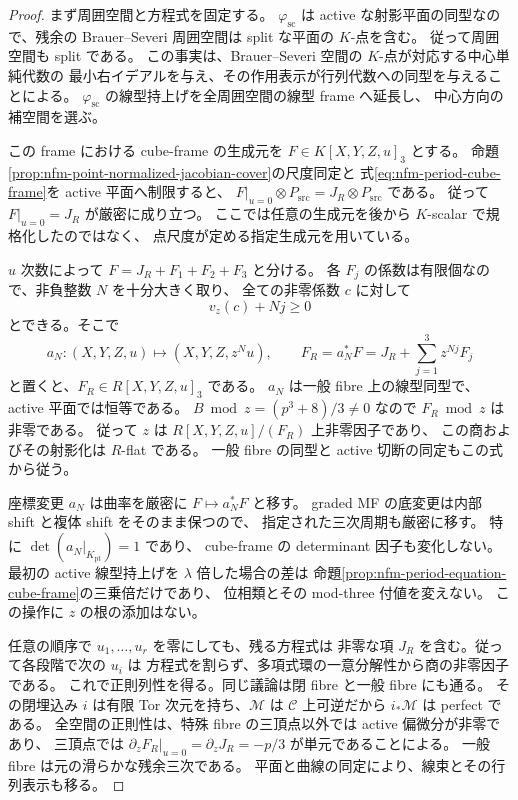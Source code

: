 \begin{proof}
まず周囲空間と方程式を固定する。
$\varphi_{\mathrm{sc}}$ は active な射影平面の同型なので、残余の
Brauer--Severi 周囲空間は split な平面の $K$-点を含む。
従って周囲空間も split である。
この事実は、Brauer--Severi 空間の $K$-点が対応する中心単純代数の
最小右イデアルを与え、その作用表示が行列代数への同型を与えることによる。
$\varphi_{\mathrm{sc}}$ の線型持上げを全周囲空間の線型 frame へ延長し、
中心方向の補空間を選ぶ。

この frame における cube-frame の生成元を $F\in K[X,Y,Z,u]_3$ とする。
命題\ref{prop:nfm-point-normalized-jacobian-cover}の尺度同定と
式\eqref{eq:nfm-period-cube-frame}を active 平面へ制限すると、
$F|_{u=0}\otimes P_{\mathrm{src}}=J_R\otimes P_{\mathrm{src}}$ である。
従って $F|_{u=0}=J_R$ が厳密に成り立つ。
ここでは任意の生成元を後から $K$-scalar で規格化したのではなく、
点尺度が定める指定生成元を用いている。

$u$ 次数によって $F=J_R+F_1+F_2+F_3$ と分ける。
各 $F_j$ の係数は有限個なので、非負整数 $N$ を十分大きく取り、
全ての非零係数 $c$ に対して
\[
 v_z(c)+Nj\ge0
\]
とできる。そこで
\[
 a_N:(X,Y,Z,u)\longmapsto(X,Y,Z,z^N u),\qquad
 F_R=a_N^*F=J_R+\sum_{j=1}^3z^{Nj}F_j
\]
と置くと、$F_R\in R[X,Y,Z,u]_3$ である。
$a_N$ は一般 fibre 上の線型同型で、active 平面では恒等である。
$B\bmod z=(p^3+8)/3\ne0$ なので $F_R\bmod z$ は非零である。
従って $z$ は $R[X,Y,Z,u]/(F_R)$ 上非零因子であり、
この商およびその射影化は $R$-flat である。
一般 fibre の同型と active 切断の同定もこの式から従う。

座標変更 $a_N$ は曲率を厳密に $F\mapsto a_N^*F$ と移す。
graded MF の底変更は内部 shift と複体 shift をそのまま保つので、
指定された三次周期も厳密に移す。
特に $\det(a_N|_{K_{\mathrm{pt}}})=1$ であり、
cube-frame の determinant 因子も変化しない。
最初の active 線型持上げを $\lambda$ 倍した場合の差は
命題\ref{prop:nfm-period-equation-cube-frame}の三乗倍だけであり、
位相類とその mod-three 付値を変えない。
この操作に $z$ の根の添加はない。

任意の順序で $u_1,\ldots,u_r$ を零にしても、残る方程式は
非零な項 $J_R$ を含む。従って各段階で次の $u_i$ は
方程式を割らず、多項式環の一意分解性から商の非零因子である。
これで正則列性を得る。同じ議論は閉 fibre と一般 fibre にも通る。
その閉埋込み $i$ は有限 Tor 次元を持ち、$\mathcal M$ は
$\mathcal C$ 上可逆だから $i_*\mathcal M$ は perfect である。
全空間の正則性は、特殊 fibre の三頂点以外では active 偏微分が非零であり、
三頂点では $\partial_zF_R|_{u=0}=\partial_zJ_R=-p/3$ が単元であることによる。
一般 fibre は元の滑らかな残余三次である。
平面と曲線の同定により、線束とその行列表示も移る。
\end{proof}

